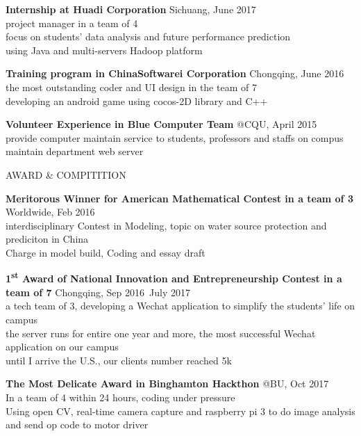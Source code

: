 \documentclass{article}
\begin{document}
\noindent
\textbf{Internship at Huadi Corporation}
\dotfill Sichuang, June 2017 \\
    \indent project manager in a team of 4 \\
    \indent focus on students' data analysis and future performance prediction \\
    \indent using Java and multi-servers Hadoop platform

\noindent
\textbf{Training program in ChinaSoftwarei Corporation}
\dotfill Chongqing, June 2016 \\
    \indent the most outstanding coder and UI design in the team of 7\\
    \indent developing an android game using cocos-2D library and C++

\noindent
\textbf{Volunteer Experience in Blue Computer Team}
\dotfill @CQU, April 2015 \\
    \indent provide computer maintain service to students, professors and staffs on compus \\
    \indent maintain department web server


\vskip 0.1in
\noindent
AWARD \& COMPITITION
\hrulefill

\noindent
\textbf{Meritorous Winner for American Mathematical Contest in a team of 3}
\dotfill Worldwide, Feb 2016 \\
    \indent interdisciplinary Contest in Modeling, topic on water source protection and prediciton in China\\
    \indent Charge in model build, Coding and essay draft

\noindent
\textbf{1\textsuperscript{st} Award of National Innovation and Entrepreneurship Contest in a team of 7}
\dotfill Chongqing, Sep 2016~July 2017 \\
    \indent a tech team of 3, developing a Wechat application to simplify the students' life on campus \\
    \indent the server runs for entire one year and more, the most successful Wechat application on our campus \\
    \indent until I arrive the U.S., our clients number reached 5k

\noindent
\textbf{The Most Delicate Award in Binghamton Hackthon}
\dotfill @BU, Oct 2017 \\
    \indent In a team of 4 within 24 hours, coding under pressure \\
    \indent Using open CV, real-time camera capture and raspberry pi 3 to do image analysis and send op code to motor driver
\end{document}
